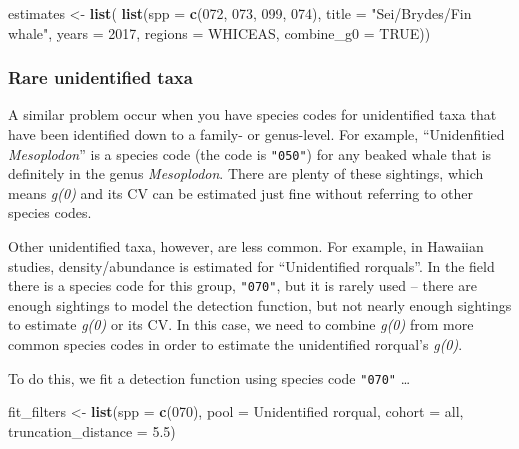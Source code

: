 \documentclass[
]{book}
\newenvironment{Shaded}{\begin{snugshade}}{\end{snugshade}}
\newcommand{\AttributeTok}[1]{\textcolor[rgb]{0.13,0.29,0.53}{#1}}
\newcommand{\ConstantTok}[1]{\textcolor[rgb]{0.56,0.35,0.01}{#1}}
\newcommand{\DecValTok}[1]{\textcolor[rgb]{0.00,0.00,0.81}{#1}}
\newcommand{\FloatTok}[1]{\textcolor[rgb]{0.00,0.00,0.81}{#1}}
\newcommand{\FunctionTok}[1]{\textcolor[rgb]{0.13,0.29,0.53}{\textbf{#1}}}
\newcommand{\NormalTok}[1]{#1}
\newcommand{\OtherTok}[1]{\textcolor[rgb]{0.56,0.35,0.01}{#1}}
\newcommand{\StringTok}[1]{\textcolor[rgb]{0.31,0.60,0.02}{#1}}
\begin{document}
\begin{Shaded}
\begin{Highlighting}[]
\NormalTok{estimates }\OtherTok{\textless{}{-}} \FunctionTok{list}\NormalTok{(}
  \FunctionTok{list}\NormalTok{(}\AttributeTok{spp =} \FunctionTok{c}\NormalTok{(}\StringTok{\textquotesingle{}072\textquotesingle{}}\NormalTok{, }\StringTok{\textquotesingle{}073\textquotesingle{}}\NormalTok{, }\StringTok{\textquotesingle{}099\textquotesingle{}}\NormalTok{, }\StringTok{\textquotesingle{}074\textquotesingle{}}\NormalTok{),}
       \AttributeTok{title =} \StringTok{"Sei/Bryde\textquotesingle{}s/Fin whale"}\NormalTok{,}
       \AttributeTok{years =} \DecValTok{2017}\NormalTok{,}
       \AttributeTok{regions =} \StringTok{\textquotesingle{}WHICEAS\textquotesingle{}}\NormalTok{,}
       \AttributeTok{combine\_g0 =} \ConstantTok{TRUE}\NormalTok{))}
\end{Highlighting}
\end{Shaded}

\hypertarget{rare-unidentified-taxa}{%
\subsubsection*{Rare unidentified taxa}\label{rare-unidentified-taxa}}

A similar problem occur when you have species codes for unidentified taxa that have been identified down to a family- or genus-level. For example, ``Unidenfitied \emph{Mesoplodon}'' is a species code (the code is \texttt{"050"}) for any beaked whale that is definitely in the genus \emph{Mesoplodon}. There are plenty of these sightings, which means \emph{g(0)} and its CV can be estimated just fine without referring to other species codes.

Other unidentified taxa, however, are less common. For example, in Hawaiian studies, density/abundance is estimated for ``Unidentified rorquals''. In the field there is a species code for this group, \texttt{"070"}, but it is rarely used -- there are enough sightings to model the detection function, but not nearly enough sightings to estimate \emph{g(0)} or its CV. In this case, we need to combine \emph{g(0)} from more common species codes in order to estimate the unidentified rorqual's \emph{g(0)}.

To do this, we fit a detection function using species code \texttt{"070"} \ldots{}

\begin{Shaded}
\begin{Highlighting}[]
\NormalTok{fit\_filters }\OtherTok{\textless{}{-}}
    \FunctionTok{list}\NormalTok{(}\AttributeTok{spp =} \FunctionTok{c}\NormalTok{(}\StringTok{\textquotesingle{}070\textquotesingle{}}\NormalTok{),}
         \AttributeTok{pool =} \StringTok{\textquotesingle{}Unidentified rorqual\textquotesingle{}}\NormalTok{,}
         \AttributeTok{cohort =} \StringTok{\textquotesingle{}all\textquotesingle{}}\NormalTok{,}
         \AttributeTok{truncation\_distance =} \FloatTok{5.5}\NormalTok{)}
\end{Highlighting}
\end{Shaded}
\end{document}
